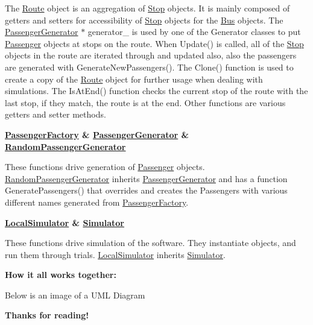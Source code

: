 The \hyperlink{classRoute}{Route} object is an aggregation of \hyperlink{classStop}{Stop} objects. It is mainly composed of getters and setters for accessibility of \hyperlink{classStop}{Stop} objects for the \hyperlink{classBus}{Bus} objects. The \hyperlink{classPassengerGenerator}{Passenger\+Generator} $\ast$ generator\+\_\+ is used by one of the Generator classes to put \hyperlink{classPassenger}{Passenger} objects at stops on the route. When Update() is called, all of the \hyperlink{classStop}{Stop} objects in the route are iterated through and updated also, also the passengers are generated with Generate\+New\+Passengers(). The Clone() function is used to create a copy of the \hyperlink{classRoute}{Route} object for further usage when dealing with simulations. The Is\+At\+End() function checks the current stop of the route with the last stop, if they match, the route is at the end. Other functions are various getters and setter methods.

{\bfseries \hyperlink{classPassengerFactory}{Passenger\+Factory} \& \hyperlink{classPassengerGenerator}{Passenger\+Generator} \& \hyperlink{classRandomPassengerGenerator}{Random\+Passenger\+Generator}}

These functions drive generation of \hyperlink{classPassenger}{Passenger} objects. \hyperlink{classRandomPassengerGenerator}{Random\+Passenger\+Generator} inherits \hyperlink{classPassengerGenerator}{Passenger\+Generator} and has a function Generate\+Passengers() that overrides and creates the Passengers with various different names generated from \hyperlink{classPassengerFactory}{Passenger\+Factory}.

{\bfseries \hyperlink{classLocalSimulator}{Local\+Simulator} \& \hyperlink{classSimulator}{Simulator}}

These functions drive simulation of the software. They instantiate objects, and run them through trials. \hyperlink{classLocalSimulator}{Local\+Simulator} inherits \hyperlink{classSimulator}{Simulator}.

{\bfseries How it all works together\+:}

Below is an image of a U\+ML Diagram



{\bfseries Thanks for reading!} 